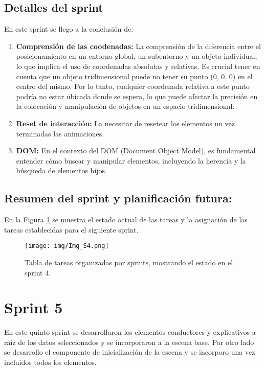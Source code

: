 \documentclass[a4paper, 12pt]{book}
\begin{document}
        \subsection{Detalles del sprint}
        En este sprint se llego a la conclusión de:
        \begin{enumerate}
            \item \textbf{Comprensión de las coodenadas:} La comprensión de la diferencia entre el posicionamiento en un entorno global, un subentorno y un objeto individual, lo que implica el uso de coordenadas absolutas y relativas. Es crucial tener en cuenta que un objeto tridimensional puede no tener su punto (0, 0, 0) en el centro del mismo. Por lo tanto, cualquier coordenada relativa a este punto podría no estar ubicada donde se espera, lo que puede afectar la precisión en la colocación y manipulación de objetos en un espacio tridimensional. 
            \item \textbf{Reset de interacción:} La necesitar de resetear los elementos un vez terminadas las animaciones.
            \item \textbf{DOM:} En el contexto del DOM (Document Object Model), es fundamental entender cómo buscar y manipular elementos, incluyendo la herencia y la búsqueda de elementos hijos. 
        \end{enumerate}

        \subsection{Resumen del sprint y planificación futura:}


        En la Figura \ref{fig:Img_S3} se muestra el estado actual de las tareas y la asignación de las tareas establecidas para el siguiente sprint.
        
            \begin{figure}[H]
                \centering
                \texttt{[image: img/Img\_S4.png]}
                                \caption{\footnotesize Tabla de tareas organizadas por sprints, mostrando el estado en el sprint 4.}
                \label{fig:Img_S3}
        \end{figure}     




    \newpage
    \section{Sprint 5}
    En este quinto sprint se desarrollaron los elementos conductores y explicativos a raíz de los datos seleccionados y se incorporaron a la escena base. Por otro lado se desarrollo el componente de inicialización de la escena y se incorporo una vez incluidos todos los elementos. 
\end{document}
